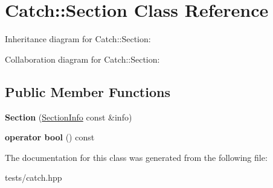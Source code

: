 \hypertarget{class_catch_1_1_section}{}\section{Catch\+:\+:Section Class Reference}
\label{class_catch_1_1_section}


Inheritance diagram for Catch\+:\+:Section\+:


Collaboration diagram for Catch\+:\+:Section\+:
\subsection*{Public Member Functions}
\begin{DoxyCompactItemize}
\item 
\mbox{\label{class_catch_1_1_section_a68fd4e51e8981aaa7ddb00d8a6abd099}} 
{\bfseries Section} (\hyperlink{struct_catch_1_1_section_info}{Section\+Info} const \&info)
\item 
\mbox{\label{class_catch_1_1_section_a0632b804dcea1417a2970620a9742eb3}} 
{\bfseries operator bool} () const
\end{DoxyCompactItemize}


The documentation for this class was generated from the following file\+:\begin{DoxyCompactItemize}
\item 
tests/catch.\+hpp\end{DoxyCompactItemize}
